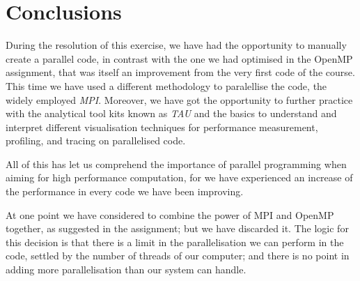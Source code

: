 \section{Conclusions}

During the resolution of this exercise, we have had the opportunity to manually create a parallel code, in contrast with the one we had optimised in the OpenMP assignment, that was itself an improvement from the very first code of the course. This time we have used a different methodology to paralellise the code, the widely employed \emph{MPI}. Moreover, we have got the opportunity to further practice with the analytical tool kits known as \emph{TAU} and the basics to understand and interpret different visualisation techniques for performance measurement, profiling, and tracing on parallelised code.

All of this has let us comprehend the importance of parallel programming when aiming for high performance computation, for we have experienced an increase of the performance in every code we have been improving.

At one point we have considered to combine the power of MPI and OpenMP together, as suggested in the assignment; but we have discarded it. The logic for this decision is that there is a limit in the parallelisation we can perform in the code, settled by the number of threads of our computer; and there is no point in adding more parallelisation than our system can handle.
